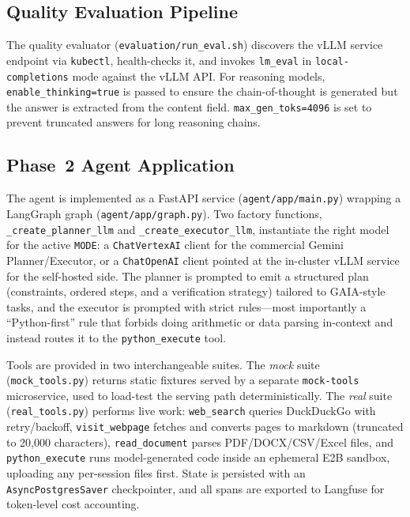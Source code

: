 \documentclass[a4paper,12pt]{report}
\begin{document}
\subsection{Quality Evaluation Pipeline}

The quality evaluator (\texttt{evaluation/run\_eval.sh}) discovers the vLLM service endpoint via \texttt{kubectl}, health-checks it, and invokes \texttt{lm\_eval} in \texttt{local-completions} mode against the vLLM API. For reasoning models, \texttt{enable\_thinking=true} is passed to ensure the chain-of-thought is generated but the answer is extracted from the content field. \texttt{max\_gen\_toks=4096} is set to prevent truncated answers for long reasoning chains.

\subsection{Phase~2 Agent Application}

The agent is implemented as a FastAPI service (\texttt{agent/app/main.py}) wrapping a LangGraph graph (\texttt{agent/app/graph.py}). Two factory functions, \texttt{\_create\_planner\_llm} and \texttt{\_create\_executor\_llm}, instantiate the right model for the active \texttt{MODE}: a \texttt{ChatVertexAI} client for the commercial Gemini Planner/Executor, or a \texttt{ChatOpenAI} client pointed at the in-cluster vLLM service for the self-hosted side. The planner is prompted to emit a structured plan (constraints, ordered steps, and a verification strategy) tailored to GAIA-style tasks, and the executor is prompted with strict rules---most importantly a ``Python-first'' rule that forbids doing arithmetic or data parsing in-context and instead routes it to the \texttt{python\_execute} tool.

Tools are provided in two interchangeable suites. The \emph{mock} suite (\texttt{mock\_tools.py}) returns static fixtures served by a separate \texttt{mock-tools} microservice, used to load-test the serving path deterministically. The \emph{real} suite (\texttt{real\_tools.py}) performs live work: \texttt{web\_search} queries DuckDuckGo with retry/backoff, \texttt{visit\_webpage} fetches and converts pages to markdown (truncated to 20{,}000 characters), \texttt{read\_document} parses PDF/DOCX/CSV/Excel files, and \texttt{python\_execute} runs model-generated code inside an ephemeral E2B sandbox, uploading any per-session files first. State is persisted with an \texttt{AsyncPostgresSaver} checkpointer, and all spans are exported to Langfuse for token-level cost accounting.
\end{document}
